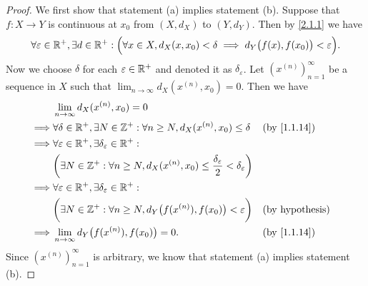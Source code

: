 \begin{proof}
  We first show that statement (a) implies statement (b).
  Suppose that \(f : X \to Y\) is continuous at \(x_0\) from \((X, d_X)\) to \((Y, d_Y)\).
  Then by \cref{2.1.1} we have
  \[
    \forall \varepsilon \in \mathbb{R}^+, \exists d \in \mathbb{R}^+ : \Big(\forall x \in X, d_X(x, x_0) < \delta \implies d_Y\big(f(x), f(x_0)\big) < \varepsilon\Big).
  \]
  Now we choose \(\delta\) for each \(\varepsilon \in \mathbb{R}^+\) and denoted it as \(\delta_\varepsilon\).
  Let \((x^{(n)})_{n = 1}^\infty\) be a sequence in \(X\) such that \(\lim_{n \to \infty} d_X(x^{(n)}, x_0) = 0\).
  Then we have
  \begin{align*}
             & \lim_{n \to \infty} d_X(x^{(n)}, x_0) = 0                                                                                                                \\
    \implies & \forall \delta \in \R^+, \exists N \in \Z^+ : \forall n \geq N, d_X(x^{(n)}, x_0) \leq \delta                                &  & \by{1.1.14}            \\
    \implies & \forall \varepsilon \in \R^+, \exists \delta_\varepsilon \in \R^+ :                                                                                      \\
             & \bigg(\exists N \in \Z^+ : \forall n \geq N, d_X(x^{(n)}, x_0) \leq \dfrac{\delta_\varepsilon}{2} < \delta_\varepsilon\bigg)                             \\
    \implies & \forall \varepsilon \in \R^+, \exists \delta_\varepsilon \in \R^+ :                                                                                      \\
             & \bigg(\exists N \in \Z^+ : \forall n \geq N, d_Y\big(f(x^{(n)}), f(x_0)\big) < \varepsilon\bigg)                             &  & \text{(by hypothesis)} \\
    \implies & \lim_{n \to \infty} d_Y\big(f(x^{(n)}), f(x_0)\big) = 0.                                                                     &  & \by{1.1.14}
  \end{align*}
  Since \((x^{(n)})_{n = 1}^\infty\) is arbitrary, we know that statement (a) implies statement (b).


\end{proof}
